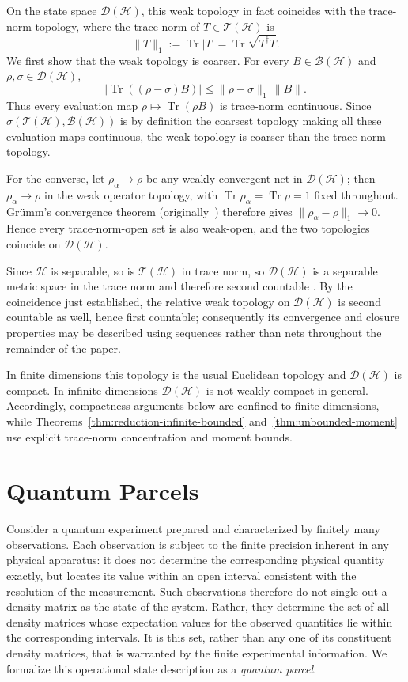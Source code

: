 \documentclass[11pt, onecolumn]{article}
\begin{document}
On the state space $\mathcal D(\mathcal H)$, this weak topology in fact
coincides with the trace-norm topology, where the trace norm of
$T\in\mathcal T(\mathcal H)$ is
\[
\|T\|_1:=\operatorname{Tr}|T|
=\operatorname{Tr}\sqrt{T^\dagger T}.
\]
We first show that the weak topology is coarser. For every
$B\in\mathcal B(\mathcal H)$ and
$\rho,\sigma\in\mathcal D(\mathcal H)$,
\[
\bigl|\operatorname{Tr}((\rho-\sigma)B)\bigr|
\leq
\|\rho-\sigma\|_1\,\|B\|.
\]
Thus every evaluation map
$\rho\mapsto\operatorname{Tr}(\rho B)$ is trace-norm continuous. Since
$\sigma(\mathcal T(\mathcal H),\mathcal B(\mathcal H))$ is by definition
the coarsest topology making all these evaluation maps continuous, the
weak topology is coarser than the trace-norm topology.

For the
converse, let $\rho_\alpha\to\rho$ be any weakly convergent net in
$\mathcal D(\mathcal H)$; then $\rho_\alpha\to\rho$ in the weak operator
topology, with $\operatorname{Tr}\rho_\alpha=\operatorname{Tr}\rho=1$
fixed throughout. Gr\"umm's convergence theorem
\cite[Thm.~2.19]{Simon2005} (originally~\cite{Grumm1973}) therefore gives
$\|\rho_\alpha-\rho\|_1\to0$. Hence every trace-norm-open set is also
weak-open, and the two topologies coincide on $\mathcal D(\mathcal H)$.

Since $\mathcal H$ is separable, so is $\mathcal T(\mathcal H)$ in trace
norm, so $\mathcal D(\mathcal H)$ is a separable metric space in the
trace norm and therefore second countable
\cite[Thm.~30.3]{Munkres2000}. By the coincidence just established, the
relative weak topology on $\mathcal D(\mathcal H)$ is second countable
as well, hence first countable; consequently its convergence and closure
properties may be described using sequences rather than nets throughout
the remainder of the paper.

In finite dimensions this topology is the usual Euclidean topology and
$\mathcal D(\mathcal H)$ is compact. In infinite dimensions
$\mathcal D(\mathcal H)$ is not weakly compact in general. Accordingly,
compactness arguments below are confined to finite dimensions, while
Theorems~\ref{thm:reduction-infinite-bounded}
and~\ref{thm:unbounded-moment} use explicit trace-norm concentration and
moment bounds.
\section{Quantum Parcels}
\label{sec:parcels}

Consider a quantum experiment prepared and characterized by finitely many
observations. Each observation is subject to the finite precision inherent
in any physical apparatus: it does not determine the corresponding physical
quantity exactly, but locates its value within an open interval consistent
with the resolution of the measurement. Such observations therefore do not
single out a density matrix as the state of the system. Rather, they determine
the set of all density matrices whose expectation values for the observed
quantities lie within the corresponding intervals. It is this set, rather
than any one of its constituent density matrices, that is warranted by the
finite experimental information. We formalize this operational state
description as a \emph{quantum parcel}.
\end{document}
